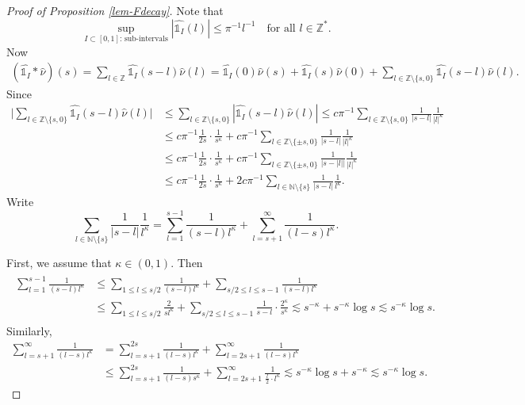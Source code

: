 \documentclass[12pt]{amsart}
\theoremstyle{definition}
\theoremstyle{remark}
\newcommand{\N}{\mathbb{N}}
\newcommand{\Z}{\mathbb{Z}}
\newcommand{\indi}{\mathds{1}}
\numberwithin{equation}{section}
\begin{document}
\begin{proof}[Proof of Proposition \ref{lem-Fdecay}]
Note that 
\[
 \sup_{\text{$I \subset[0,1]$: sub-intervals}}|\widehat{\indi_I} (l)|  \le \pi^{-1} l^{-1}\quad \text{for all $l\in \Z^*$}. 
\]
Now 
\begin{align*}
(\widehat{\indi_I}* \widehat{\nu})(s) = \sum_{l\in \Z} \widehat{\indi_I} (s-l) \widehat{\nu}(l)  =       \widehat{\indi_I} (0) \widehat{\nu}(s) +    \widehat{\indi_I} (s) \widehat{\nu}(0)    +\sum_{l\in \Z\setminus \{s, 0\}} \widehat{\indi_I} (s-l) \widehat{\nu}(l).
\end{align*}
Since 
\begin{align*}
\Big| \sum_{l\in \Z\setminus \{s,0\}} \widehat{\indi_I} (s-l) \widehat{\nu}(l)\Big|  & \le  \sum_{l\in \Z\setminus \{s,0\}} |\widehat{\indi_I} (s-l) \widehat{\nu}(l)|   \le  c\pi^{-1} \sum_{l\in \Z\setminus \{s,0\}}      \frac{1}{|s-l|} \frac{1}{|l|^\kappa}
\\
& \le c\pi^{-1} \frac{1}{2s} \cdot \frac{1}{s^\kappa} + c\pi^{-1} \sum_{l\in \Z\setminus \{\pm s,0\}}      \frac{1}{|s-l|} \frac{1}{|l|^\kappa}
\\
& \le c\pi^{-1} \frac{1}{2s} \cdot \frac{1}{s^\kappa} + c\pi^{-1} \sum_{l\in \Z\setminus \{\pm s,0\}}      \frac{1}{|s-|l||} \frac{1}{|l|^\kappa}
\\
& \le c\pi^{-1} \frac{1}{2s} \cdot \frac{1}{s^\kappa} + 2  c\pi^{-1} \sum_{l\in \N\setminus \{s\}}      \frac{1}{|s-l|} \frac{1}{l^\kappa}.  
\end{align*}
Write 
\[
\sum_{l\in \N\setminus \{s\}}      \frac{1}{|s-l|} \frac{1}{l^\kappa}= \sum_{l=1}^{s-1}   \frac{1}{(s-l) l^\kappa}  + \sum_{l = s+1}^\infty  \frac{1}{(l-s) l^\kappa}.
\]

First, we assume that $\kappa \in (0,1)$.  Then 
\begin{align}\label{small-part}
\begin{split}
\sum_{l=1}^{s-1}      \frac{1}{(s-l) l^\kappa}  &  \le \sum_{1\le l \le s/2} \frac{1}{(s-l) l^\kappa}  + \sum_{s/2 \le l \le s-1} \frac{1}{(s-l) l^\kappa}  
\\
&\le \sum_{1\le l \le s/2} \frac{2}{s l^\kappa} + \sum_{s/2 \le l \le s-1} \frac{1}{s-l} \cdot     \frac{2^\kappa}{s^{\kappa}} \lesssim s^{-\kappa} + s^{-\kappa} \log s \lesssim s^{-\kappa} \log s.
\end{split}
\end{align}
Similarly, 
\begin{align*}
\sum_{l = s+1}^\infty  \frac{1}{(l-s) l^\kappa}  & = \sum_{l = s+1}^{2s}  \frac{1}{(l-s) l^\kappa}  + \sum_{l = 2s+1}^\infty  \frac{1}{(l-s) l^\kappa}  
\\
& \le \sum_{l = s+1}^{2s}  \frac{1}{(l-s) s^\kappa} + \sum_{l = 2s+1}^{\infty}  \frac{1}{ \frac{l}{2} \cdot l^\kappa}  \lesssim s^{-\kappa} \log s + s^{-\kappa}  \lesssim s^{-\kappa} \log s. 
\end{align*}


\end{proof}
\end{document}
